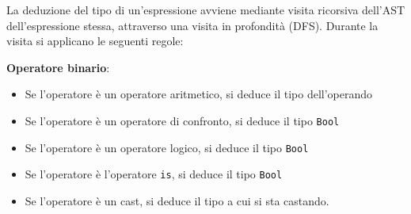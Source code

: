 \newpage

La deduzione del tipo di un'espressione avviene mediante visita ricorsiva dell'AST dell'espressione stessa,
attraverso una visita in profondità (DFS). Durante la visita si applicano le seguenti regole:

    \item \textbf{Operatore binario}: \begin{itemize}
        \item Se l'operatore è un operatore aritmetico, si deduce il tipo dell'operando
        \item Se l'operatore è un operatore di confronto, si deduce il tipo \texttt{Bool}
        \item Se l'operatore è un operatore logico, si deduce il tipo \texttt{Bool}
        \item Se l'operatore è l'operatore \texttt{is}, si deduce il tipo \texttt{Bool}
        \item Se l'operatore è un cast, si deduce il tipo a cui si sta castando.
\end{itemize}